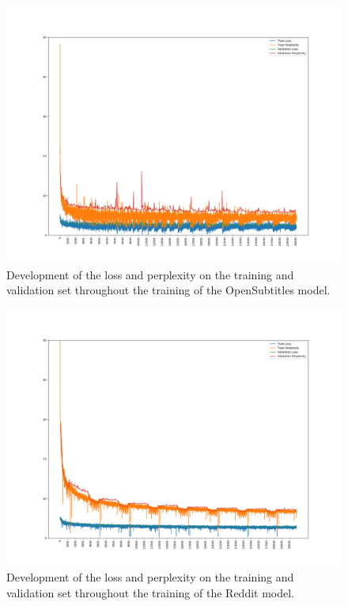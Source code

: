 \begin{figure}[H]
	\includegraphics[width=\linewidth]{img/plots/opensubtitles_not_reversed/train_metrics.png}
	\caption{Development of the loss and perplexity on the training and validation set throughout the training of the OpenSubtitles model.}
	\label{results:learning_process:metrics:opensubtitles}
\end{figure}

\begin{figure}[H]
	\includegraphics[width=\linewidth]{img/plots/reddit/train_metrics.png}
	\caption{Development of the loss and perplexity on the training and validation set throughout the training of the Reddit model.}
	\label{results:learning_process:metrics:reddit}
\end{figure}

